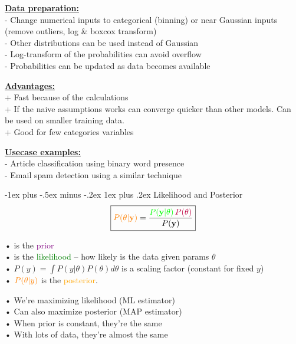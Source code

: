 \documentclass[letterpaper, 10.5pt,landscape]{article}
\makeatletter
\def\mathcolor#1#{\@mathcolor{#1}}
\def\@mathcolor#1#2#3{%
  \protect\leavevmode
  \begingroup
    \color#1{#2}#3%
  \endgroup
}
\renewcommand{\subsubsection}{\@startsection{subsubsection}{3}{0mm}%
                                {-1ex plus -.5ex minus -.2ex}%
                                {1ex plus .2ex}%
                                {\normalfont\small\bfseries}}
\makeatother
\begin{document}
\begin{multicols*}{3}
\vspace{3pt}
\textbf{\underline{Data preparation:}} \\
- Change numerical inputs to categorical (binning) or near Gaussian inputs (remove outliers, log \& boxcox transform) \\
- Other distributions can be used instead of Gaussian \\
- Log-transform of the probabilities can avoid overflow \\
- Probabilities can be updated as data becomes available


\vspace{3pt}
\textbf{\underline{Advantages:}} \\
+ Fast because of the calculations \\
+ If the naive assumptions works can converge quicker than other models. Can be used on smaller training data.  \\
+ Good for few categories variables


\vspace{3pt}
\textbf{\underline{Usecase examples:}} \\
- Article classification using binary word presence \\
- Email spam detection using a similar technique


\vspace{3pt}
\subsubsection{Likelihood and Posterior} 
\[\boxed{\mathcolor{orange}{P(\theta |\textbf{y})} = \frac{\mathcolor{green}{P(\textbf{y}|\theta)} \, \mathcolor{purple}{P(\theta)} }{P(\textbf{y})}} \]
\vspace{-10pt}

•  is the \textcolor{purple}{prior}
\\

•  is the \textcolor{green}{likelihood} – how likely is the data given params $\theta$ \\
• $P(y) = \int P(y | \theta) P(\theta) d\theta $ is a scaling factor (constant for fixed $y$) \\
• $\mathcolor{orange}{P(\theta | y)}$ is the \textcolor{orange}{posterior}.


\vspace{3pt}
• We’re maximizing likelihood (ML estimator) \\
• Can also maximize posterior (MAP estimator)\\
\hspace{7pt} • When prior is constant, they’re the same\\
\hspace{7pt} • With lots of data, they’re almost the same\\





\end{multicols*}
\end{document}

